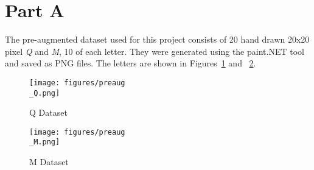 \newpage
\section{Part A}
\label{sec:sec_a}
The pre-augmented dataset used for this project consists of 20 hand drawn 20x20 pixel \textit{Q} and \textit{M}, 10 of each letter. They were generated using the paint.NET tool and saved as PNG files. The letters are shown in Figures~\ref{fig:pre Q} and ~\ref{fig:pre M}. 


\begin{figure}[htpb]
	\centering
	\texttt{[image: figures/preaug\\\_Q.png]}
	\caption{Q Dataset}
	\label{fig:pre Q}
\end{figure}

\begin{figure}[htpb]
	\centering
	\texttt{[image: figures/preaug\\\_M.png]}
	\caption{M Dataset}
	\label{fig:pre M}
\end{figure}